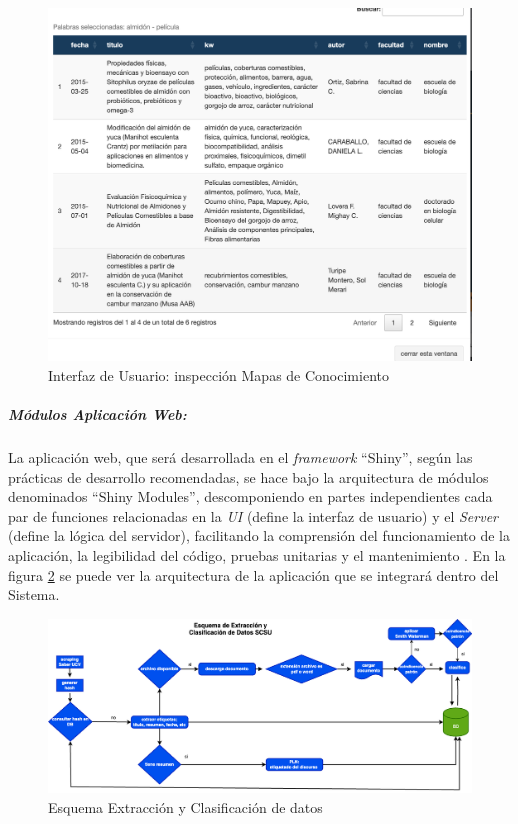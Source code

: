 \documentclass[
  12pt,
  openany]{book}
\begin{document}
\begin{enumerate}
  \begin{figure}

  {\centering \includegraphics[width=0.6\linewidth]{images/05-desarrollo/4_ciclo/UI/uiinspeccionmapas} 

  }

  \caption{Interfaz de Usuario: inspección Mapas de Conocimiento }\label{fig:detallemc}
  \end{figure}
\end{enumerate}

\hypertarget{muxf3dulos-aplicaciuxf3n-web}{%
\subparagraph{Módulos Aplicación Web:}\label{muxf3dulos-aplicaciuxf3n-web}}

La aplicación web, que será desarrollada en el \emph{framework} ``Shiny'', según las prácticas de desarrollo recomendadas, se hace bajo la arquitectura de módulos denominados ``Shiny Modules'', descomponiendo en partes independientes cada par de funciones relacionadas en la \emph{UI} (define la interfaz de usuario) y el \emph{Server} (define la lógica del servidor), facilitando la comprensión del funcionamiento de la aplicación, la legibilidad del código, pruebas unitarias y el mantenimiento \citep{wickham2021}. En la figura \ref{fig:shinymodulo} se puede ver la arquitectura de la aplicación que se integrará dentro del Sistema.

\begin{figure}

{\centering \includegraphics[width=0.9\linewidth]{images/05-desarrollo/4_ciclo/esquema extraccion} 

}

\caption{Esquema Extracción y Clasificación de datos}\label{fig:shinymodulo}
\end{figure}
\end{document}
